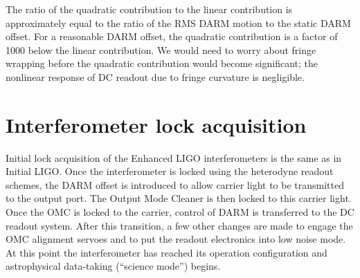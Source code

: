 The ratio of the quadratic contribution to the linear contribution is
approximately equal to the ratio of the RMS DARM motion to the static
DARM offset.  For a reasonable DARM offset, the quadratic contribution
is a factor of 1000 below the linear contribution.  We would need to
worry about fringe wrapping before the quadratic contribution would
become significant; the nonlinear response of DC readout due to fringe
curvature is negligible.

\section{Interferometer lock acquisition}

Initial lock acquisition of the Enhanced LIGO interferometers is the
same as in Initial LIGO\cite{Evans2002Lock}. Once the interferometer
is locked using the heterodyne readout schemes, the DARM offset is
introduced to allow carrier light to be transmitted to the output
port. The Output Mode Cleaner is then locked to this carrier
light. Once the OMC is locked to the carrier, control of DARM is
transferred to the DC readout system.  After this transition, a few
other changes are made to engage the OMC alignment servoes and to put
the readout electronics into low noise mode. At this point the
interferometer has reached its operation configuration and
astrophysical data-taking ({}``science mode'') begins.



